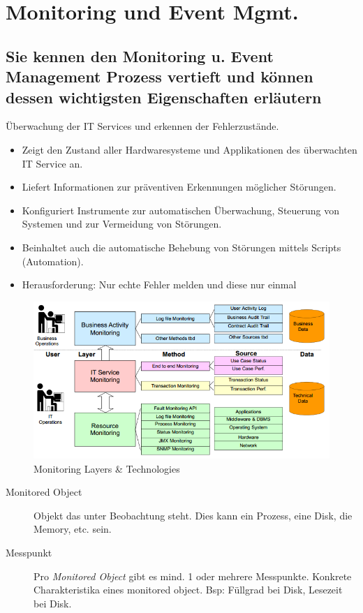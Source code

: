 \chapter{Monitoring und Event Mgmt.}
\label{sec:monitoring}

\section{Sie kennen den Monitoring u. Event Management Prozess vertieft und können dessen wichtigsten Eigenschaften erläutern}

Überwachung der IT Services und erkennen der Fehlerzustände. 

\begin{itemize}
	\item Zeigt den Zustand aller Hardwaresysteme und Applikationen des überwachten IT Service an.
	\item Liefert Informationen zur präventiven Erkennungen möglicher Störungen.
	\item Konfiguriert Instrumente zur automatischen Überwachung, Steuerung von Systemen und zur Vermeidung von Störungen.
	\item Beinhaltet auch die automatische Behebung von Störungen mittels Scripts (Automation).
	\item Herausforderung: Nur echte Fehler melden und diese nur einmal
\end{itemize}

\begin{figure}[h!]
\centering
\includegraphics[width=0.7\linewidth]{fig/itil-monitoring-layers}
\caption{Monitoring Layers \& Technologies}
\label{fig:itil-monitoring-layers}
\end{figure}

\begin{description}
	\item[Monitored Object] Objekt das unter Beobachtung steht. Dies kann ein Prozess, eine Disk, die Memory, etc. sein.
	\item[Messpunkt] Pro \emph{Monitored Object} gibt es mind. 1 oder mehrere Messpunkte. Konkrete Charakteristika eines monitored object. Bsp: Füllgrad bei Disk, Lesezeit bei Disk.
\end{description}

